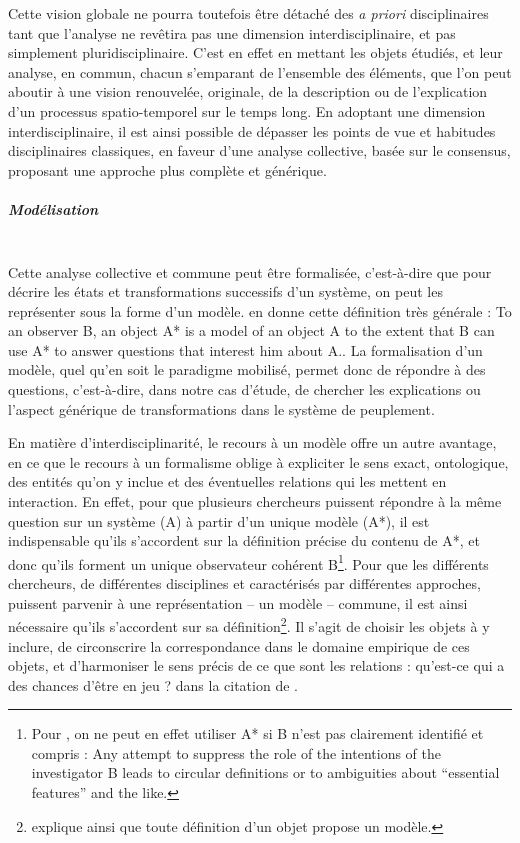 Cette vision globale ne pourra toutefois être détaché des \textit{a priori} disciplinaires tant que l'analyse ne revêtira pas une dimension interdisciplinaire, et pas simplement pluridisciplinaire.
C'est en effet en mettant les objets étudiés, et leur analyse, en commun, chacun s'emparant de l'ensemble des éléments, que l'on peut aboutir à une vision renouvelée, originale, de la description ou de l'explication d'un processus spatio-temporel sur le temps long.
En adoptant une dimension interdisciplinaire, il est ainsi possible de dépasser les points de vue et habitudes disciplinaires classiques, en faveur d'une analyse collective, basée sur le consensus, proposant une approche plus complète et générique.

\subparagraph{Modélisation}~\\
Cette analyse collective et commune peut être formalisée, c'est-à-dire que pour décrire les états et transformations successifs d'un système, on peut les représenter sous la forme d'un modèle.
\textcite[\S 2]{minsky_matter_1965} en donne cette définition très générale :
\og To an observer B, an object A* is a model of an object A to the	extent that B can use A* to answer questions that interest him about A.\fg{}.
La formalisation d'un modèle, quel qu'en soit le paradigme mobilisé, permet donc de répondre à des questions, c'est-à-dire, dans notre cas d'étude, de chercher les explications ou l'aspect générique de transformations dans le système de peuplement.

En matière d'interdisciplinarité, le recours à un modèle offre un autre avantage, en ce que le recours à un formalisme oblige à expliciter le sens exact, ontologique, des entités qu'on y inclue et des éventuelles relations qui les mettent en interaction.
En effet, pour que plusieurs chercheurs puissent répondre à la même question sur un système (A) à partir d'un unique modèle (A*), il est indispensable qu'ils s'accordent sur la définition précise du contenu de A*, et donc qu'ils forment un unique \og observateur\fg{} cohérent B\footnote{
	Pour \textcite[\S 2]{minsky_matter_1965}, on ne peut en effet utiliser A* si B n'est pas clairement identifié et compris : \og Any attempt to suppress the role of the intentions of the investigator B leads to circular definitions or to ambiguities about ``essential features'' and the like.\fg{}
}.
Pour que les différents chercheurs, de différentes disciplines et caractérisés par différentes approches, puissent parvenir à une représentation -- un modèle -- commune, il est ainsi nécessaire qu'ils s'accordent sur sa définition\footnote{
	\textcite[22]{brunet2000modeles} explique ainsi que \og toute définition d'un objet propose un modèle\fg{}.
}.
Il s'agit de choisir les objets à y inclure, de circonscrire la correspondance dans le domaine empirique de ces objets, et d'harmoniser le sens précis de ce que sont les relations : \og qu'est-ce qui a des chances d'être en jeu ?\fg{} dans la citation de \textcite{brunet2000modeles}.

